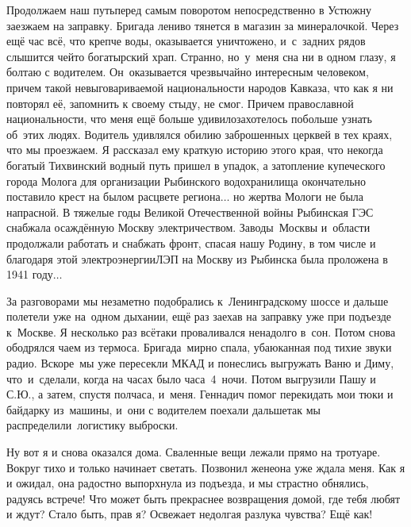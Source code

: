 Продолжаем наш путь\mdash перед самым поворотом непосредственно в Устюжну заезжаем на заправку. Бригада лениво тянется в магазин за минералочкой. Через ещё час всё, что крепче воды, оказывается уничтожено, и~с~задних рядов слышится чей\sdash то богатырский храп. Странно, но~у~меня сна ни в одном глазу, я болтаю с водителем. Он~оказывается чрезвычайно интересным человеком, причем такой невыговариваемой национальности народов Кавказа, что как я ни повторял её, запомнить к своему стыду, не смог. Причем православной национальности, что меня ещё больше удивило\mdash захотелось побольше узнать об~этих людях. Водитель удивлялся обилию заброшенных церквей в тех краях, что мы проезжаем. Я рассказал ему краткую историю этого края, что некогда богатый Тихвинский водный путь пришел в упадок, а затопление купеческого города Молога для организации Рыбинского водохранилища окончательно поставило крест на былом расцвете региона$\ldots$ но жертва Мологи не была напрасной. В тяжелые годы Великой Отечественной войны Рыбинская ГЭС снабжала осаждённую Москву электричеством. Заводы~Москвы и~области продолжали работать и снабжать фронт, спасая нашу Родину, в том числе и благодаря этой электроэнергии\mdash ЛЭП на Москву из Рыбинска была проложена в 1941 году$\ldots$ 

За разговорами мы незаметно подобрались к~Ленинградскому шоссе и дальше полетели уже на~одном дыхании, ещё раз заехав на заправку уже при подъезде к~Москве. Я несколько раз всё\sdash таки проваливался ненадолго в~сон. Потом снова ободрялся чаем из термоса. Бригада~мирно спала, убаюканная под тихие звуки радио. Вскоре~мы уже пересекли МКАД и понеслись выгружать Ваню и Диму, что~и~сделали, когда на часах было часа~4~ночи. Потом выгрузили Пашу и С.Ю., а затем, спустя полчаса, и~меня. Геннадич помог перекидать мои тюки и байдарку из~машины, и~они с водителем поехали дальше\mdash так мы распределили~логистику выброски. 

Ну вот я и снова оказался дома. Сваленные вещи лежали прямо на тротуаре. Вокруг тихо и только начинает светать. Позвонил жене\mdash она уже ждала меня. Как я и ожидал, она радостно выпорхнула из подъезда, и мы страстно обнялись, радуясь встрече! Что может быть прекраснее возвращения домой, где тебя любят и ждут? Стало быть, прав я? Освежает недолгая разлука чувства? Ещё как! 

\begin{center}
\end{center}
